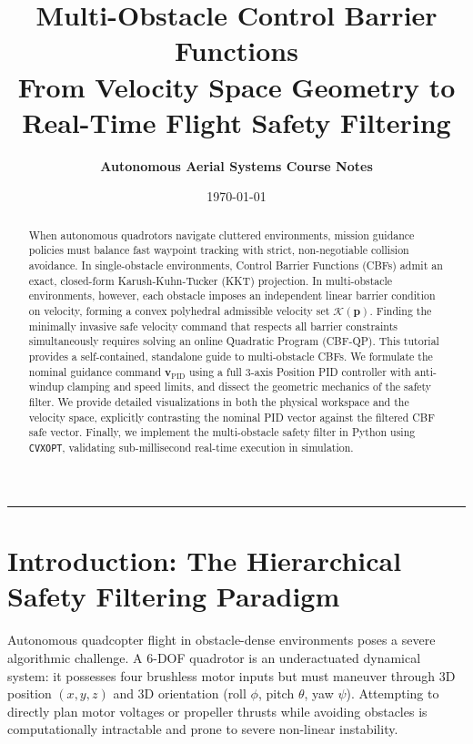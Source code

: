 \documentclass[11pt,a4paper]{article}
\title{\vspace{-1.5cm}\textbf{\Huge Multi-Obstacle Control Barrier Functions}\\[0.3cm]
\Large From Velocity Space Geometry to Real-Time Flight Safety Filtering}
\author{\textbf{Autonomous Aerial Systems Course Notes}}
\date{\today}
\begin{document}
\maketitle

\begin{abstract}
When autonomous quadrotors navigate cluttered environments, mission guidance policies must balance fast waypoint tracking with strict, non-negotiable collision avoidance. In single-obstacle environments, Control Barrier Functions (CBFs) admit an exact, closed-form Karush-Kuhn-Tucker (KKT) projection. In multi-obstacle environments, however, each obstacle imposes an independent linear barrier condition on velocity, forming a convex polyhedral admissible velocity set $\mathcal{K}(\mathbf{p})$. Finding the minimally invasive safe velocity command that respects all barrier constraints simultaneously requires solving an online Quadratic Program (CBF-QP). This tutorial provides a self-contained, standalone guide to multi-obstacle CBFs. We formulate the nominal guidance command $\mathbf{v}_{\mathrm{PID}}$ using a full 3-axis Position PID controller with anti-windup clamping and speed limits, and dissect the geometric mechanics of the safety filter. We provide detailed visualizations in both the physical workspace and the velocity space, explicitly contrasting the nominal PID vector against the filtered CBF safe vector. Finally, we implement the multi-obstacle safety filter in Python using \texttt{CVXOPT}, validating sub-millisecond real-time execution in simulation.
\end{abstract}

\tableofcontents
\vspace{0.5cm}
\hrule
\vspace{0.8cm}

\section{Introduction: The Hierarchical Safety Filtering Paradigm}

Autonomous quadcopter flight in obstacle-dense environments poses a severe algorithmic challenge. A 6-DOF quadrotor is an underactuated dynamical system: it possesses four brushless motor inputs but must maneuver through 3D position $(x, y, z)$ and 3D orientation (roll $\phi$, pitch $\theta$, yaw $\psi$). Attempting to directly plan motor voltages or propeller thrusts while avoiding obstacles is computationally intractable and prone to severe non-linear instability.
\end{document}
